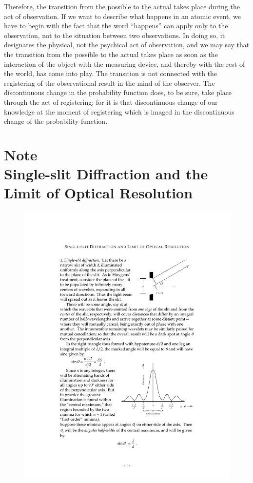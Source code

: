 Therefore, the transition from the possible to the actual takes place
during the act of observation. If we want to describe what happens in an
atomic event, we have to begin with the fact that the word ``happens''
can apply only to the observation, not to the situation between two
observations. In doing so, it designates the physical, not the psychical
act of observation, and we may say that the transition from the possible
to the actual takes place as soon as the interaction of the object with
the measuring device, and thereby with the rest of the world, has come
into play. The transition is not connected with the registering of the
observational result in the mind of the observer. The discontinuous
change in the probability function does, to be sure, take place through
the act of registering; for it is that discontinuous change of our
knowledge at the moment of registering which is imaged in the
discontinuous change of the probability function.

\section*{Note\\
  {\large Single-slit Diffraction and the Limit of Optical Resolution}}

\begin{figure}
\includegraphics{images/10_heisenberg/Figure1SSD.pdf}
\end{figure}

